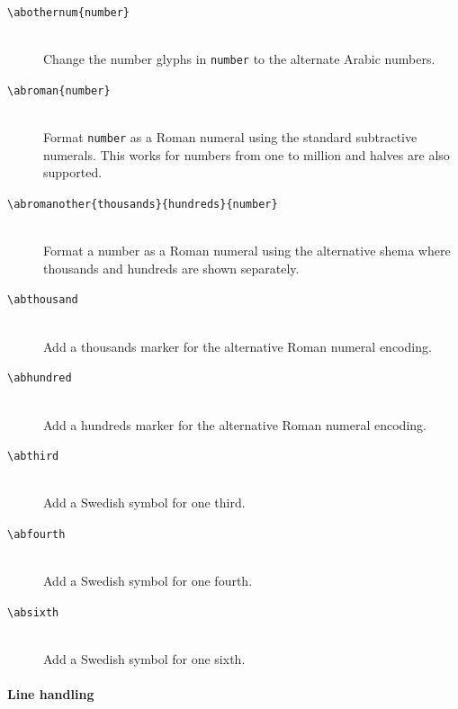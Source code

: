 \documentclass[a4paper]{article}
\newcommand{\feature}[1]{\texttt{#1}}
\newcommand{\ltxncmd}[1]{\texttt{\textbackslash{}#1}}
\newcommand{\ltxcmd}[2]{\texttt{\textbackslash{}#1\{#2\}}}
\newcommand{\ltxcmdthree}[4]{\texttt{\textbackslash{}#1\{#2\}\{#3\}\{#4\}}}
\begin{document}
\begin{description}

\item [\ltxcmd{abothernum}{number}] \mbox{} \\
  Change the number glyphs in \feature{number} to the alternate Arabic
  numbers.

\item [\ltxcmd{abroman}{number}] \mbox{} \\
  Format \feature{number} as a Roman numeral using the standard
  subtractive numerals. This works for numbers from one to million and
  halves are also supported.

\item [\ltxcmdthree{abromanother}{thousands}{hundreds}{number}]
  \mbox{} \\
  Format a number as a Roman numeral using the alternative shema where
  thousands and hundreds are shown separately. 

\item [\ltxncmd{abthousand}] \mbox{} \\
  Add a thousands marker for the alternative Roman numeral encoding. 
  
\item [\ltxncmd{abhundred}] \mbox{} \\
  Add a hundreds marker for the alternative Roman numeral encoding. 

\item [\ltxncmd{abthird}] \mbox{} \\
  Add a Swedish symbol for one third. 

\item [\ltxncmd{abfourth}] \mbox{} \\
  Add a Swedish symbol for one fourth. 

\item [\ltxncmd{absixth}] \mbox{} \\
  Add a Swedish symbol for one sixth. 

\end{description}

\paragraph{Line handling}
\end{document}
